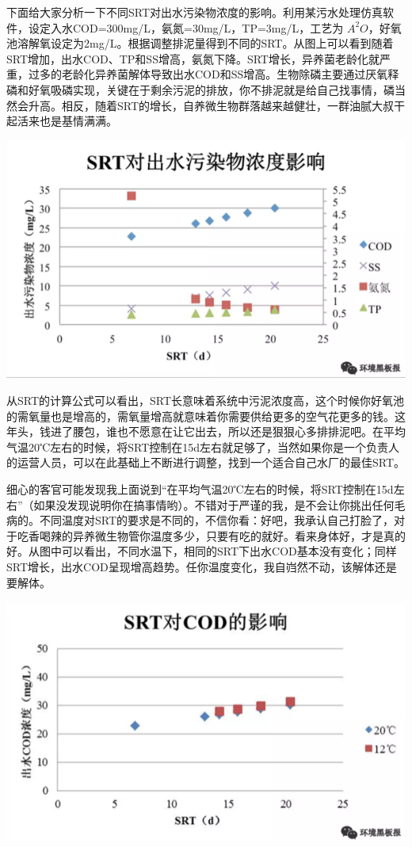 \documentclass[]{book}
\begin{document}
下面给大家分析一下不同SRT对出水污染物浓度的影响。利用某污水处理仿真软件，设定入水COD=300mg/L，氨氮=30mg/L，TP=3mg/L，工艺为 \(A^2O\)，好氧池溶解氧设定为2mg/L。根据调整排泥量得到不同的SRT。从图上可以看到随着SRT增加，出水COD、TP和SS增高，氨氮下降。SRT增长，异养菌老龄化就严重，过多的老龄化异养菌解体导致出水COD和SS增高。生物除磷主要通过厌氧释磷和好氧吸磷实现，关键在于剩余污泥的排放，你不排泥就是给自己找事情，磷当然会升高。相反，随着SRT的增长，自养微生物群落越来越健壮，一群油腻大叔干起活来也是基情满满。

\includegraphics[width=8.33in]{images/srt2}

从SRT的计算公式可以看出，SRT长意味着系统中污泥浓度高，这个时候你好氧池的需氧量也是增高的，需氧量增高就意味着你需要供给更多的空气花更多的钱。这年头，钱进了腰包，谁也不愿意在让它出去，所以还是狠狠心多排排泥吧。在平均气温20℃左右的时候，将SRT控制在15d左右就足够了，当然如果你是一个负责人的运营人员，可以在此基础上不断进行调整，找到一个适合自己水厂的最佳SRT。

细心的客官可能发现我上面说到``在平均气温20℃左右的时候，将SRT控制在15d左右''（如果没发现说明你在搞事情哟）。不错对于严谨的我，是不会让你挑出任何毛病的。不同温度对SRT的要求是不同的，不信你看：好吧，我承认自己打脸了，对于吃香喝辣的异养微生物管你温度多少，只要有吃的就好。看来身体好，才是真的好。从图中可以看出，不同水温下，相同的SRT下出水COD基本没有变化；同样SRT增长，出水COD呈现增高趋势。任你温度变化，我自岿然不动，该解体还是要解体。

\includegraphics[width=8.33in]{images/srt3}
\end{document}
